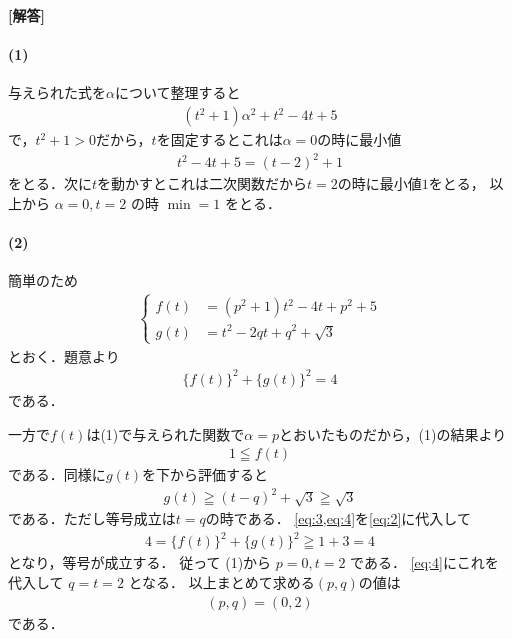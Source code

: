 \documentclass[../../main.tex]{subfiles}
\begin{document}
\begin{oframed}
  
\end{oframed}

{\bf [解答]}

\paragraph{(1)}

与えられた式を$\alpha$について整理すると
\begin{align}
  \left(t^2+1\right)\alpha^2 + t^2-4t+5
\end{align}
で，$t^2+1>0$だから，$t$を固定するとこれは$\alpha=0$の時に最小値
\begin{align}
  t^2-4t+5 = \left(t-2\right)^2+1
\end{align}
をとる．次に$t$を動かすとこれは二次関数だから$t=2$の時に最小値$1$をとる，
以上から $\alpha=0, t=2$ の時 $\min = 1$ をとる．

\paragraph{(2)}
簡単のため
\begin{align}
  \begin{cases}
    f(t)&=(p^2+1)t^2-4t+p^2+5 \\
    g(t)&=t^2-2qt+q^2+\sqrt{3}
  \end{cases}\label{eq:1}
\end{align}
とおく．題意より
\begin{align}
  \{f(t)\}^2+\{g(t)\}^2=4 \label{eq:2}
\end{align}
である．

一方で$f(t)$は(1)で与えられた関数で$\alpha=p$とおいたものだから，(1)の結果より
\begin{align}
  1 \leqq f(t) \label{eq:3}
\end{align}
である．同様に$g(t)$を下から評価すると
\begin{align}
  g(t) \geqq (t-q)^2+\sqrt{3} \geqq \sqrt{3} \label{eq:4}
\end{align}
である．ただし等号成立は$t=q$の時である．
\cref{eq:3,eq:4}を\cref{eq:2}に代入して
\begin{align}
  4 = \{f(t)\}^2+\{g(t)\}^2 \geqq 1 + 3 = 4
\end{align}
となり，等号が成立する．
従って (1)から $p=0, t=2$ である．
\cref{eq:4}にこれを代入して $q=t=2$ となる．
以上まとめて求める$(p,q)$の値は
\begin{align}
  (p, q) = (0, 2)
\end{align}
である．
\end{document}
